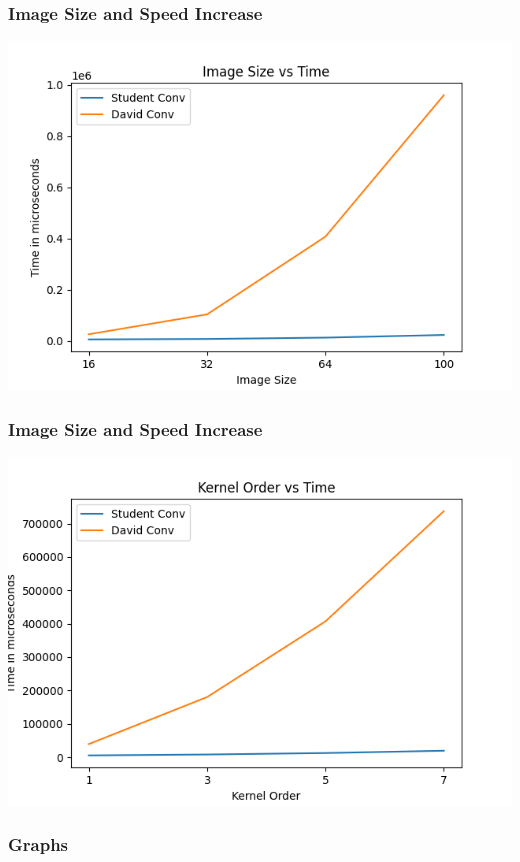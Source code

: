 \documentclass{beamer}
\begin{document}
\begin{frame}[fragile]
\frametitle{Image Size and Speed Increase}
\includegraphics[width=1\textwidth]{images/Image_size_vs_time_X-X-5-32-32}
\end{frame}

\begin{frame}[fragile]
\frametitle{Image Size and Speed Increase}
\includegraphics[width=1\textwidth]{images/kernel_vs_time_64-64-X-32-32}
\end{frame}

\begin{frame}[fragile]
\frametitle{Graphs}
\end{frame}
\end{document}
